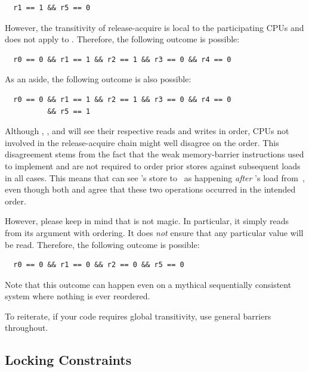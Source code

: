 {\scriptsize
\begin{verbatim}
  r1 == 1 && r5 == 0
\end{verbatim}
}

However, the transitivity of release-acquire is local to the participating
CPUs and does not apply to .  Therefore, the following outcome
is possible:

{\scriptsize
\begin{verbatim}
  r0 == 0 && r1 == 1 && r2 == 1 && r3 == 0 && r4 == 0
\end{verbatim}
}

As an aside, the following outcome is also possible:

{\scriptsize
\begin{verbatim}
  r0 == 0 && r1 == 1 && r2 == 1 && r3 == 0 && r4 == 0
          && r5 == 1
\end{verbatim}
}

Although , , and  will see their respective reads and
writes in order, CPUs not involved in the release-acquire chain might
well disagree on the order.  This disagreement stems from the fact that
the weak memory-barrier instructions used to implement 
and  are not required to order prior stores against
subsequent loads in all cases.  This means that  can see 's
store to~ as happening {\em after} 's load from~, even though
both  and  agree that these two operations occurred in the
intended order.

However, please keep in mind that  is not magic.
In particular, it simply reads from its argument with ordering.  It does
{\em not} ensure that any particular value will be read.  Therefore, the
following outcome is possible:

{\scriptsize
\begin{verbatim}
  r0 == 0 && r1 == 0 && r2 == 0 && r5 == 0
\end{verbatim}
}

Note that this outcome can happen even on a mythical sequentially
consistent system where nothing is ever reordered.

To reiterate, if your code requires global transitivity, use general
barriers throughout.

\subsection{Locking Constraints}
\label{sec:advsync:Locking Constraints}

